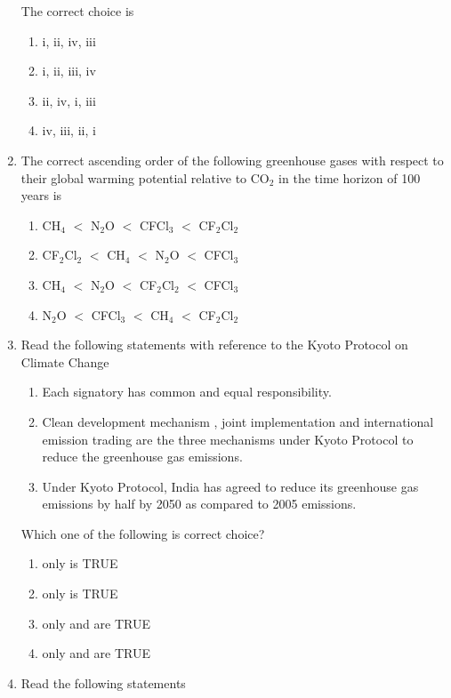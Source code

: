 \documentclass[journal,12pt,onecolumn]{IEEEtran}
\theoremstyle{remark}
\begin{document}
\begin{enumerate}
The correct choice is

\begin{enumerate}
\item i, ii, iv, iii
\item i, ii, iii, iv
\item ii, iv, i, iii
\item iv, iii, ii, i
\end{enumerate}
\hfill{}

\item The correct ascending order of the following greenhouse gases with respect to their global warming potential relative to CO$_2$ in the time horizon of 100 years is

\begin{enumerate}
\item CH$_4$ $<$ N$_2$O $<$ CFCl$_3$ $<$ CF$_2$Cl$_2$
\item CF$_2$Cl$_2$ $<$ CH$_4$ $<$ N$_2$O $<$ CFCl$_3$
\item CH$_4$ $<$ N$_2$O $<$ CF$_2$Cl$_2$ $<$ CFCl$_3$
\item N$_2$O $<$ CFCl$_3$ $<$ CH$_4$ $<$ CF$_2$Cl$_2$
\end{enumerate}
\hfill{}

\newpage

\item Read the following statements with reference to the Kyoto Protocol on Climate Change

\begin{enumerate}[label=\roman*.]
\item Each signatory  has common and equal responsibility.
\item Clean development mechanism , joint implementation  and international emission trading are the three mechanisms under Kyoto Protocol to reduce the greenhouse gas emissions.
\item Under Kyoto Protocol, India has agreed to reduce its greenhouse gas emissions by half by 2050 as compared to 2005 emissions.
\end{enumerate}

Which one of the following is correct choice?

\begin{enumerate}
\item only  is TRUE
\item only  is TRUE
\item only  and  are TRUE
\item only  and  are TRUE
\end{enumerate}
\hfill{}
\item Read the following statements


\end{enumerate}
\end{document}

